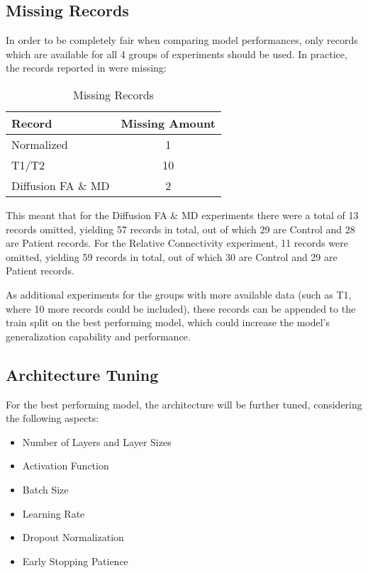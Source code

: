 \subsection{Missing Records}

In order to be completely fair when comparing model performances, only records which are available for all 4 groups of experiments should be used. In practice, the records reported in  were missing:
\begin{table}[H]
\centering
\begin{tabular}{|l|c|}
\hline
\textbf{Record} & \textbf{Missing Amount} \\ \hline
Normalized & 1 \\ \hline
T1/T2 & 10 \\ \hline
Diffusion \ac{FA} \& \ac{MD} & 2 \\ \hline
\end{tabular}
\caption{Missing Records}
\label{tab:misrec}
\end{table}
This meant that for the Diffusion \ac{FA} \& \ac{MD} experiments there were a total of 13 records omitted, yielding 57 records in total, out of which 29 are Control and 28 are Patient records. For the Relative Connectivity experiment, 11 records were omitted, yielding 59 records in total, out of which 30 are Control and 29 are Patient records.\par
As additional experiments for the groups with more available data (such as T1, where 10 more records could be included), these records can be appended to the train split on the best performing model, which could increase the model's generalization capability and performance.

\subsection{Architecture Tuning}

For the best performing model, the architecture will be further tuned, considering the following aspects:
\begin{itemize}
  \item Number of Layers and Layer Sizes
  \item Activation Function
  \item Batch Size
  \item Learning Rate
  \item Dropout Normalization
  \item Early Stopping Patience
\end{itemize}

